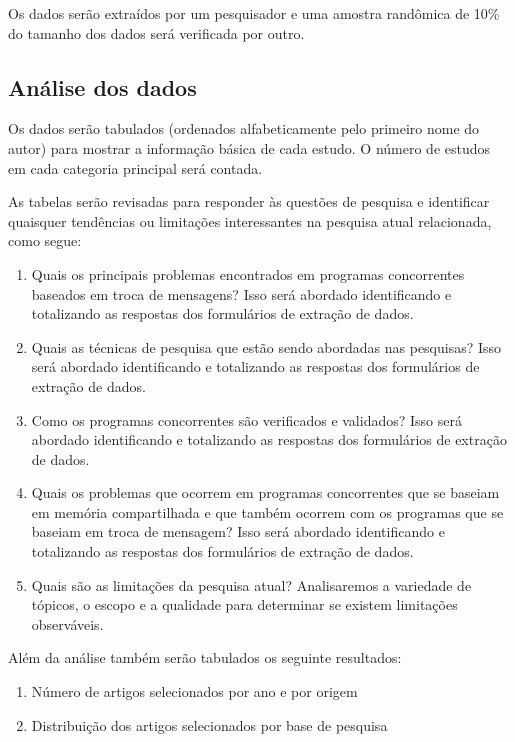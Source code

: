Os dados serão extraídos por um pesquisador e uma amostra randômica de 10\% do tamanho dos dados será verificada por outro. 

\subsection{Análise dos dados}

Os dados serão tabulados (ordenados alfabeticamente pelo primeiro nome do autor) para mostrar a informação básica de cada estudo. O número de estudos em cada categoria principal será contada.

As tabelas serão revisadas para responder às questões de pesquisa e identificar quaisquer tendências ou limitações interessantes na pesquisa atual relacionada, como segue:

\begin{enumerate}[label=Pergunta \arabic*:]
    \item Quais os principais problemas encontrados em programas concorrentes baseados em troca de mensagens? Isso será abordado identificando e totalizando as respostas dos formulários de extração de dados.
    \item Quais as técnicas de pesquisa que estão sendo abordadas nas pesquisas?  Isso será abordado identificando e totalizando as respostas dos formulários de extração de dados.
    \item Como os programas concorrentes são verificados e validados?  Isso será abordado identificando e totalizando as respostas dos formulários de extração de dados.
    \item Quais os problemas que ocorrem em programas concorrentes que se baseiam em memória compartilhada e que também ocorrem com os programas que se baseiam em troca de mensagem?  Isso será abordado identificando e totalizando as respostas dos formulários de extração de dados.
    \item Quais são as limitações da pesquisa atual? Analisaremos a variedade de tópicos, o escopo e a qualidade para determinar se existem limitações observáveis.
\end{enumerate}

Além da análise também serão tabulados os seguinte resultados:

\begin{enumerate}
    \item Número de artigos selecionados por ano e por origem 
    \item Distribuição dos artigos selecionados por base de pesquisa
\end{enumerate}


